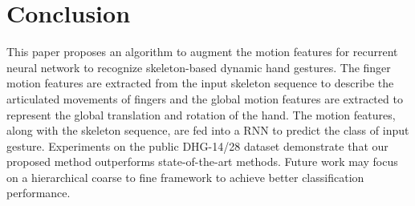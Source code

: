\documentclass{article}
\begin{document}
\section{Conclusion}
\label{sec:conclusion}

This paper proposes an algorithm to augment the motion features for recurrent neural network to recognize skeleton-based dynamic hand gestures. The finger motion features are extracted from the input skeleton sequence to describe the articulated movements of fingers and the global motion features are extracted to represent the global translation and rotation of the hand. The motion features, along with the skeleton sequence, are fed into a RNN to predict the class of input gesture. Experiments on the public DHG-14/28 dataset demonstrate that our proposed method outperforms state-of-the-art methods. Future work may focus on a hierarchical coarse to fine framework to achieve better classification performance.










\end{document}
